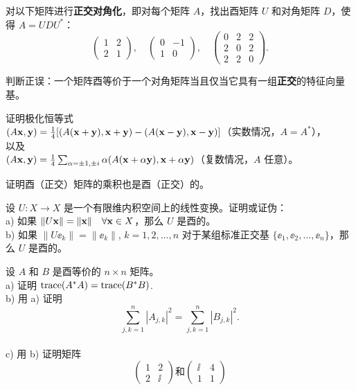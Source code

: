 \begin{problemset}
\item \label{ex:05-06-01} 对以下矩阵进行\textbf{正交对角化}，即对每个矩阵 $A$，找出酉矩阵 $U$ 和对角矩阵 $D$，使得 $A = UDU^*$：
$$\begin{pmatrix} 1 & 2 \\ 2 & 1 \end{pmatrix}, \quad \begin{pmatrix} 0 & -1 \\ 1 & 0 \end{pmatrix}, \quad \begin{pmatrix} 0 & 2 & 2 \\ 2 & 0 & 2 \\ 2 & 2 & 0 \end{pmatrix}.$$
\item \label{ex:05-06-02} 判断正误：一个矩阵酉等价于一个对角矩阵当且仅当它具有一组\textbf{正交}的特征向量基。
\item \label{ex:05-06-03} 证明极化恒等式
\\
$(A\mathbf{x}, \mathbf{y}) = \frac{1}{4} [ (A(\mathbf{x}+\mathbf{y}), \mathbf{x}+\mathbf{y}) - (A(\mathbf{x}-\mathbf{y}), \mathbf{x}-\mathbf{y}) ]$（实数情况，$A=A^*$），
\\
以及
\\
$(A\mathbf{x}, \mathbf{y}) = \frac{1}{4} \sum_{\alpha = \pm 1, \pm i} \alpha (A(\mathbf{x}+\alpha \mathbf{y}), \mathbf{x}+\alpha \mathbf{y})$（复数情况，$A$ 任意）。
\item \label{ex:05-06-04} 证明酉（正交）矩阵的乘积也是酉（正交）的。
\item \label{ex:05-06-05} 设 $U: X \to X$ 是一个有限维内积空间上的线性变换。证明或证伪：
\\
a) 如果 $\|U\mathbf{x}\| = \|\mathbf{x}\| \quad \forall \mathbf{x} \in X$，那么 $U$ 是酉的。
\\
b) 如果 $\|U\ee_k\| = \|\ee_k\|$, $k=1, 2, \dots, n$ 对于某组标准正交基 $\{\ee_1, \ee_2, \dots, \ee_n\}$，那么 $U$ 是酉的。
\item \label{ex:05-06-06} 设 $A$ 和 $B$ 是酉等价的 $n \times n$ 矩阵。
\\
a) 证明 $\operatorname{trace}(A^*A) = \operatorname{trace}(B^*B)$.~
\\
b) 用 a) 证明 $$\sum_{j,k=1}^n |A_{j,k}|^2 = \sum_{j,k=1}^n |B_{j,k}|^2.$$
\\
c) 用 b) 证明矩阵
$$\begin{pmatrix} 1 & 2 \\ 2 & \ii \end{pmatrix} \text{和} \begin{pmatrix} \ii & 4 \\ 1 & 1 \end{pmatrix}$$

\end{problemset}
